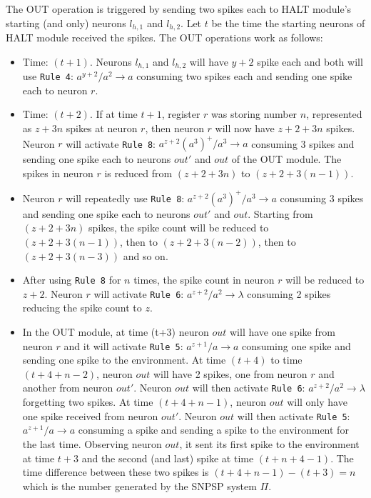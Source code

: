 \documentclass[runningheads,a4paper]{llncs}
\begin{document}
The OUT operation is triggered by sending two spikes each to HALT module's starting (and only) neurons $l_{h,1}$ and $l_{h,2}$. Let $t$ be the time
the starting neurons of HALT module received the spikes. The OUT operations work as follows:
\begin{itemize}
   \item Time: $(t+1)$. Neurons $l_{h,1}$ and $l_{h,2}$ will have $y+2$ spike each and both will use \texttt{Rule 4}: $a^{y+2}/a^2 \rightarrow a$
                        consuming two spikes each and sending one spike each to neuron $r$.
   \item Time: $(t+2)$. If at time $t+1$, register $r$ was storing number $n$, represented as $z+3n$ spikes at neuron $r$, then neuron $r$ will now
         have $z+2+3n$ spikes. Neuron $r$ will activate \texttt{Rule 8}: $a^{z+2}(a^3)^+/a^3 \rightarrow a$ consuming 3 spikes and sending one spike 
         each to neurons $out'$ and $out$ of the OUT module. The spikes in neuron $r$ is reduced from $(z+2+3n)$ to $(z+2+3(n-1))$. 
   \item Neuron $r$ will repeatedly use \texttt{Rule 8}: $a^{z+2}(a^3)^+/a^3 \rightarrow a$ consuming $3$ spikes and sending one spike each to 
         neurons $out'$ and $out$. Starting from $(z+2+3n)$ spikes, the spike count will be reduced to $(z+2+3(n-1))$, then to $(z+2+3(n-2))$, then 
         to $(z+2+3(n-3))$ and so on.
   \item After using \texttt{Rule 8} for $n$ times, the spike count in neuron $r$ will be reduced to $z+2$. Neuron $r$ will activate 
         \texttt{Rule 6}: $a^{z+2}/a^2 \rightarrow \lambda$ consuming 2 spikes reducing the spike count to $z$.
   \item In the OUT module, at time (t+3) neuron $out$ will have one spike from neuron $r$ and it will activate \texttt{Rule 5}: $a^{z+1}/a 
         \rightarrow a$ consuming one spike and sending one spike to the environment. At time $(t+4)$ to time $(t+4+n-2)$, neuron $out$ will have 2 
         spikes, one from neuron $r$ and another from neuron $out'$. Neuron $out$ will then activate \texttt{Rule 6}: $a^{z+2}/a^2 \rightarrow 
         \lambda$ forgetting two spikes. At time $(t+4+n-1)$, neuron $out$ will only have one spike received from neuron $out'$. Neuron $out$ will 
         then activate \texttt{Rule 5}: $a^{z+1}/a \rightarrow a$ consuming a spike and sending a spike to the environment for the last time.
         Observing neuron $out$, it sent its first spike to the environment at time $t+3$ and the second (and last) spike at time $(t+n+4-1)$. The
         time difference between these two spikes is $(t+4+n-1)-(t+3)=n$ which is the number generated by the SNPSP system $\Pi$.
\end{itemize}
\end{document}
